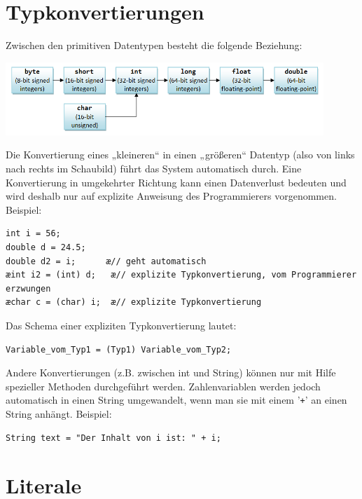 \section{Typkonvertierungen}

Zwischen den primitiven Datentypen besteht die folgende Beziehung:

\begin{center}
\includegraphics[width=0.9\textwidth]{./inf/SEKII/04_Java_Grundlagen/JavaBasics_ImplicitTypeCastingPrimitives.png}
\end{center}

Die Konvertierung eines „kleineren“ in einen „größeren“ Datentyp (also von links
nach rechts im Schaubild) führt das System automatisch durch. Eine Konvertierung
in umgekehrter Richtung kann einen Datenverlust bedeuten und wird deshalb nur
auf explizite Anweisung des Programmierers vorgenommen. Beispiel:

\begin{lstlisting}
int i = 56;
double d = 24.5;
double d2 = i;      æ// geht automatisch
æint i2 = (int) d;   æ// explizite Typkonvertierung, vom Programmierer erzwungen
æchar c = (char) i;  æ// explizite Typkonvertierung
\end{lstlisting}

Das Schema einer expliziten Typkonvertierung lautet:

\verb|Variable_vom_Typ1 = (Typ1) Variable_vom_Typ2;|

Andere Konvertierungen (z.B. zwischen int und String) können nur mit Hilfe
spezieller Methoden durchgeführt werden. Zahlenvariablen werden jedoch
automatisch in einen String umgewandelt, wenn man sie mit einem ’\lstinline|+|’
an einen String anhängt. Beispiel:

\begin{lstlisting}
String text = "Der Inhalt von i ist: " + i;
\end{lstlisting}


\section{Literale}

